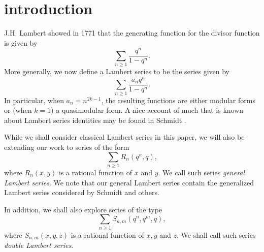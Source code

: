 \documentclass[a4paper,reqno,12pt]{amsart}
\begin{document}









\maketitle

\section{introduction}

J.H. Lambert \cite{L} showed in 1771 that the generating function for the divisor function is given by
                          $$\sum_{n\geq1} \frac{q^n}{1 - q^n}.$$
More generally, we now define a Lambert series to be the series  given by 
$$\sum_{n\geq1} \frac{a_nq^n}{1-q^n}.$$
In particular, when $a_n=n^{2k-1}$, the resulting functions are either modular forms or (when $k=1$) a quasimodular form. A nice account of much that is known about Lambert series identities may be found in Schmidt \cite{S}.

While we shall consider classical Lambert series in this paper, we will also be extending our work to series of the form
$$\sum_{n\geq1} R_n(q^n,q),$$
where $R_n(x,y)$ is a rational function of $x$ and $y$. We call such series \emph{general Lambert series}. We note that our general Lambert series contain the generalized Lambert series considered by Schmidt \cite{S} and others.

In addition, we shall also explore series of the type
$$\sum_{n\geq1} S_{n,m}(q^n,q^m,q),$$
where $S_{n,m}(x,y,z)$ is a rational function of $x, y$ and $z$. We shall call such series \emph{double Lambert series}.
\end{document}
